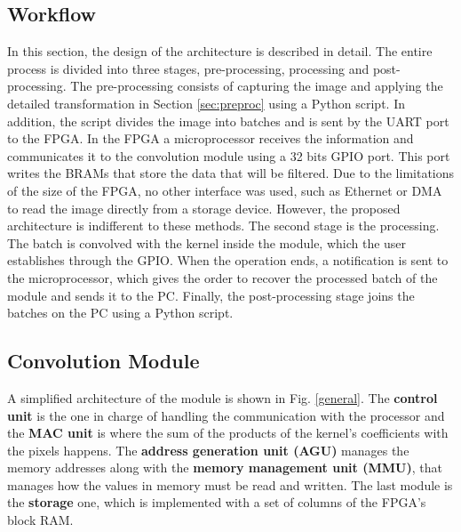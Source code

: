 \documentclass[conference,compsoc]{IEEEtran}
\begin{document}
\subsection{Workflow}
In this section, the design of the architecture is described in detail. The
entire process is divided into three stages, pre-processing, processing and
post-processing. The pre-processing consists of capturing the image and applying
the detailed transformation in Section \ref{sec:preproc} using a Python script. In
addition, the script divides the image into batches and is sent by the UART port
to the FPGA\@. In the FPGA a microprocessor receives the information and
communicates it to the convolution module using a 32 bits GPIO port. This port
writes the BRAMs that store the data that will be filtered. Due to the
limitations of the size of the FPGA, no other interface was used, such as
Ethernet or DMA to read the image directly from a storage device. However, the
proposed architecture is indifferent to these methods. The second stage is the
processing. The batch is convolved with the kernel inside the module, which the
user establishes through the GPIO. When the operation ends, a notification is
sent to the microprocessor, which gives the order to recover the processed batch
of the module and sends it to the PC. Finally, the post-processing stage joins
the batches on the PC using a Python script.




\subsection{Convolution Module}
A simplified architecture of the module is shown in Fig. \ref{general}.
The \textbf{control unit} is the one in charge of handling the communication
with the processor and the \textbf{MAC unit} is where the sum of
the products of the kernel's coefficients with the pixels happens. The
\textbf{address generation unit (AGU)} manages the memory addresses along with the
\textbf{memory management unit (MMU)}, that manages how the values in memory must be
read and written. The last module is the \textbf{storage} one, which is implemented with a
set of columns of the FPGA's block RAM.
\end{document}
